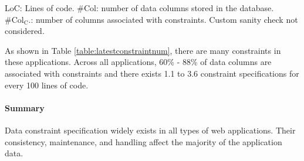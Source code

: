 \begin{table}
\centering
\caption{\# Data constraints in web applications} 

{\footnotesize LoC: Lines of code. \#Col: number of data columns stored in the database. \\
\#Col$_\text{C}$.: number of columns associated with constraints.
Custom sanity check not considered.
}
\label{table:latestconstraintnum}
\end{table}

As shown in Table \ref{table:latestconstraintnum}, there are many constraints in these applications. 
Across all applications, 60\% - 88\% of data columns are associated with constraints and there exists 1.1 to 3.6 constraint specifications for every 100 lines of code.

\paragraph{\bf Summary} Data constraint specification widely exists in all types of web applications. Their consistency, maintenance, and handling affect the majority of the application data.


